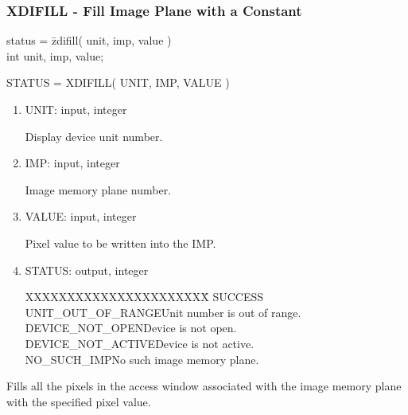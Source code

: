 \subsubsection{XDIFILL - Fill Image Plane with a Constant}
\begin{tabbing}
status = \=zdifill( unit, imp, value )\\
\>int  unit, imp, value;\\
\end{tabbing}
STATUS = XDIFILL( UNIT, IMP, VALUE )
\begin{enumerate}
\item UNIT:  input, integer

Display device unit number.
\item IMP:  input, integer

Image memory plane number.
\item VALUE:  input, integer

Pixel value to be written into the IMP.
\item STATUS:  output, integer
\begin{tabbing}
XXXXXXXXXXXXXXXXXXXXXX\=\kill
SUCCESS\\
UNIT\_OUT\_OF\_RANGE\>Unit number is out of range.\\
DEVICE\_NOT\_OPEN\>Device is not open.\\
DEVICE\_NOT\_ACTIVE\>Device is not active.\\
NO\_SUCH\_IMP\>No such image memory plane.\\
\end{tabbing}
\end{enumerate}
Fills all the pixels in the access window associated with the image
memory plane with the specified pixel value.
\newpage
